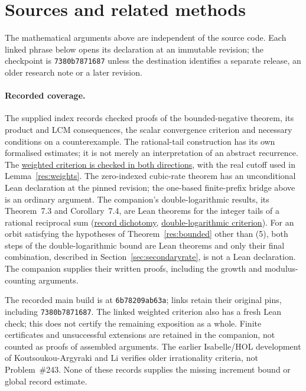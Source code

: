 \documentclass[11pt]{article}
\renewcommand{\commitshort}{7380b7871687}
\newcommand{\latecommit}{7380b7871687b6bcc41ca0143c61f232e8af6500}
\newcommand{\laterepobase}{https://github.com/wcook04/plectis-erdos/blob/\latecommit}
\begin{document}
\appendix
\section{Sources and related methods}\label{app:index}

The mathematical arguments above are independent of the source code.
Each linked phrase below opens its declaration at an immutable revision;
the checkpoint is \texttt{\commitshort} unless the destination identifies
a separate release, an older research note or a later revision.

\paragraph{Recorded coverage.}
The supplied index records checked proofs of the bounded-negative theorem,
its product and LCM consequences, the scalar convergence criterion and
necessary conditions on a counterexample. The rational-tail construction
has its own formalised estimates; it is not merely an interpretation of
an abstract recurrence. The \href{https://github.com/wcook04/plectis-erdos/blob/52d6c45ad203ba619cb5fe6ba485c0b5400519ea/lean/ErdosProblems/Erdos243/PaperCompleteR20/RealCutoffCriterion.lean\#L87}{weighted criterion is checked in both directions}, with the real cutoff used in Lemma~\ref{res:weights}. The zero-indexed cubic-rate theorem has an unconditional Lean declaration at the pinned revision; the one-based finite-prefix bridge above is an ordinary argument. The companion's double-logarithmic results, its Theorem~7.3 and Corollary~7.4, are Lean theorems for the integer tails of a rational reciprocal sum
(\href{\laterepobase/lean/ErdosProblems/Erdos243/PaperCompleteR11/QuantitativeRecordDichotomy.lean\#L340}{record dichotomy},
\href{\laterepobase/lean/ErdosProblems/Erdos243/PaperCompleteR11/InclusiveLimsup.lean\#L129}{double-logarithmic criterion}).
For an orbit satisfying the hypotheses of Theorem~\ref{res:bounded} other
than (5), both steps of the double-logarithmic bound are Lean theorems and
only their final combination, described in Section~\ref{sec:secondaryrate},
is not a Lean declaration. The companion supplies their written proofs,
including the growth and modulus-counting arguments.

The recorded main build is at \texttt{6b78209ab63a}; links retain their
original pins, including \texttt{\commitshort}. The linked weighted criterion also has a fresh Lean check; this does not
certify the remaining exposition as a whole. Finite certificates
and unsuccessful extensions are retained in the companion, not counted
as proofs of assembled arguments. The earlier Isabelle/HOL development
of Koutsoukou-Argyraki and Li \cite{kouli2020} verifies older irrationality
criteria, not Problem~\#243. None of these records supplies the missing
increment bound or global record estimate.
\end{document}
